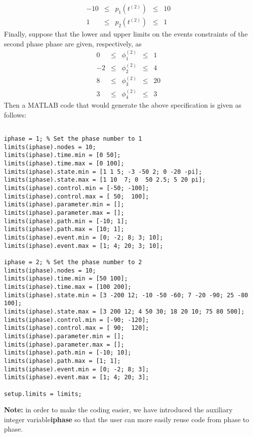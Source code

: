 \documentclass[10pt,final]{report}
\newenvironment{shadedframe}{%
  \def\FrameCommand{\fcolorbox{black}{shadecolor}}%
  \MakeFramed {\FrameRestore}}
{\endMakeFramed}
\begin{document}
\begin{shadedframe}
\begin{displaymath}
\begin{array}{rcccr}
    -10 & \leq & p_1(t^{(2)}) & \leq & 10 \\
     1 & \leq & p_2(t^{(2)})& \leq & 1
  \end{array}
\end{displaymath}
Finally, suppose that the lower and upper limits on the events
constraints of the second phase phase are given, respectively, as
\begin{displaymath}
  \begin{array}{rcccr}
    0 & \leq & \phi_1^{(2)}  & \leq & 1 \\
     -2 & \leq & \phi_2^{(2)} & \leq & 4 \\
    8 & \leq & \phi_3^{(2)} & \leq & 20 \\
    3 & \leq & \phi_4^{(2)} & \leq & 3
  \end{array}
\end{displaymath}
Then a MATLAB code that would generate the above specification is
given as follows:
\begin{verbatim}

iphase = 1; % Set the phase number to 1
limits(iphase).nodes = 10;
limits(iphase).time.min = [0 50];
limits(iphase).time.max = [0 100];
limits(iphase).state.min = [1 1 5; -3 -50 2; 0 -20 -pi];
limits(iphase).state.max = [1 10  7; 0  50 2.5; 5 20 pi];
limits(iphase).control.min = [-50; -100];
limits(iphase).control.max = [ 50;  100];
limits(iphase).parameter.min = [];
limits(iphase).parameter.max = [];
limits(iphase).path.min = [-10; 1];
limits(iphase).path.max = [10; 1];
limits(iphase).event.min = [0; -2; 8; 3; 10];
limits(iphase).event.max = [1; 4; 20; 3; 10];

iphase = 2; % Set the phase number to 2
limits(iphase).nodes = 10;
limits(iphase).time.min = [50 100];
limits(iphase).time.max = [100 200];
limits(iphase).state.min = [3 -200 12; -10 -50 -60; 7 -20 -90; 25 -80 100];
limits(iphase).state.max = [3 200 12; 4 50 30; 18 20 10; 75 80 500];
limits(iphase).control.min = [-90; -120];
limits(iphase).control.max = [ 90;  120];
limits(iphase).parameter.min = [];
limits(iphase).parameter.max = [];
limits(iphase).path.min = [-10; 10];
limits(iphase).path.max = [1; 1];
limits(iphase).event.min = [0; -2; 8; 3];
limits(iphase).event.max = [1; 4; 20; 3];

setup.limits = limits;

\end{verbatim}
\end{shadedframe}
{\noindent}{\bf Note:}  in order to make the coding easier, we have
introduced the auxiliary integer variable{\bf iphase} so that the user
can more easily reuse code from phase to phase.
\end{document}
